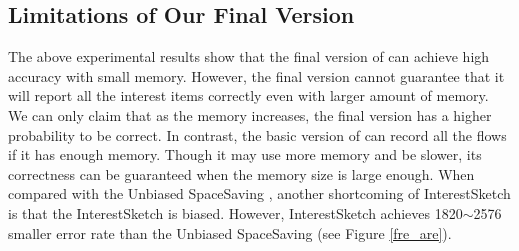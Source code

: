 \presub 
\subsection{Limitations of Our Final Version} %
\label{eva_def}

The above experimental results show that the final version of \sketchname{} can achieve high accuracy with small memory. However, the final version cannot guarantee that it will report all the interest items correctly even with larger amount of memory. We can only claim that as the memory increases, the final version has a higher probability to be correct. In contrast, the basic version of \sketchname{} can record all the flows if it has enough memory. Though it may use more memory and be slower, its correctness can be guaranteed when the memory size is large enough.
When compared with the Unbiased SpaceSaving \cite{unbiasedsketch}, another shortcoming of InterestSketch is that the InterestSketch is biased.
However, InterestSketch achieves 1820$\sim$2576 smaller error rate than the Unbiased SpaceSaving (see Figure \ref{fre_are}).
